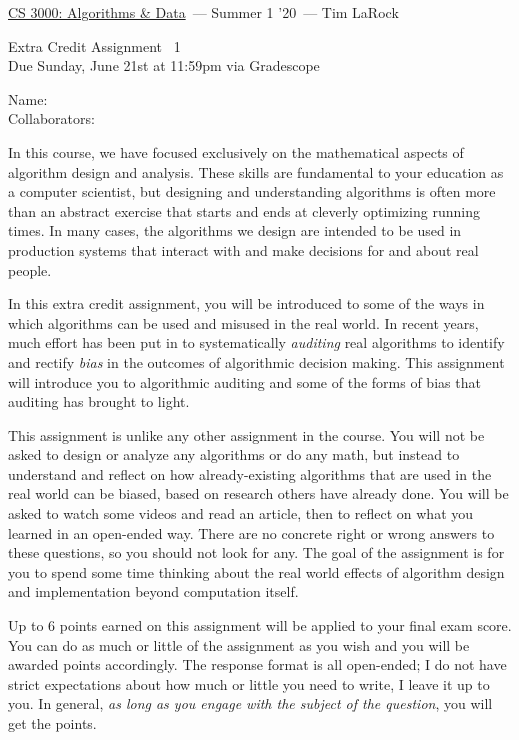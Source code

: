 \documentclass[11pt]{article}
\newcommand{\yourname}{}
\newcommand{\yourcollaborators}{}
\newcommand{\course}{\href{tlarock.github.io/teaching/cs3000/syllabus.html}{CS 3000: Algorithms \& Data}}
\newcommand{\instructor}{Tim LaRock}
\newcommand{\semester}{Summer 1 '20}
\newcommand{\hwnum}{1}
\newcommand{\hwdue}{Due Sunday, June 21st at 11:59pm via Gradescope}
\theoremstyle{theorem}
\begin{document}
	{\Large 
		\begin{center} \course\ --- \semester\ --- \instructor \end{center}}
	{\large
		\vspace{10pt}
		\noindent Extra Credit Assignment ~\hwnum \vspace{2pt}\\
		\hwdue}
	
	\bigskip
	{\large
		\noindent Name: \yourname \vspace{2pt}\\ Collaborators: \yourcollaborators}
	
	\vspace{1cm}
	
			In this course, we have focused exclusively on the mathematical aspects of algorithm design and analysis. These skills are fundamental to your education as a computer scientist, but designing and understanding algorithms is often more than an abstract exercise that starts and ends at cleverly optimizing running times. In many cases, the algorithms we design are intended to be used in production systems that interact with and make decisions for and about real people.
	
		In this extra credit assignment, you will be introduced to some of the ways in which algorithms can be used and misused in the real world. In recent years, much effort has been put in to systematically \emph{auditing} real algorithms to identify and rectify \emph{bias} in the outcomes of algorithmic decision making. This assignment will introduce you to algorithmic auditing and some of the forms of bias that auditing has brought to light.
		
		This assignment is unlike any other assignment in the course. You will not be asked to design or analyze any algorithms or do any math, but instead to understand and reflect on how already-existing algorithms that are used in the real world can be biased, based on research others have already done. You will be asked to watch some videos and read an article, then to reflect on what you learned in an open-ended way. There are no concrete right or wrong answers to these questions, so you should not look for any. The goal of the assignment is for you to spend some time thinking about the real world effects of algorithm design and implementation beyond computation itself.
		
		Up to 6 points earned on this assignment will be applied to your final exam score. You can do as much or little of the assignment as you wish and you will be awarded points accordingly. The response format is all open-ended; I do not have strict expectations about how much or little you need to write, I leave it up to you. In general, \emph{as long as you engage with the subject of the question}, you will get the points.
		
\end{document}
